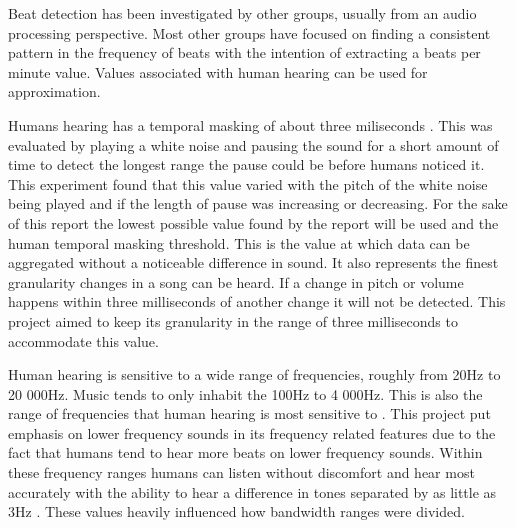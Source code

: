 Beat detection has been investigated by other groups, usually from an audio processing perspective. Most other groups have focused on finding a consistent pattern in the frequency of beats with the intention of extracting a beats per minute value. Values associated with human hearing can be used for approximation.

Humans hearing has a temporal masking of about three miliseconds \cite{temporalmasking}. This was evaluated by playing a white noise and pausing the sound for a short amount of time to detect the longest range the pause could be before humans noticed it. This experiment found that this value varied with the pitch of the white noise being played and if the length of pause was increasing or decreasing. For the sake of this report the lowest possible value found by the report will be used and the human temporal masking threshold. This is the value at which data can be aggregated without a noticeable difference in sound. It also represents the finest granularity changes in a song can be heard. If a change in pitch or volume happens within three milliseconds of another change it will not be detected. This project aimed to keep its granularity in the range of three milliseconds to accommodate this value.

Human hearing is sensitive to a wide range of frequencies, roughly from 20Hz to 20 000Hz\cite{frequencylimits}. Music tends to only inhabit the 100Hz to 4 000Hz. This is also the range of frequencies that human hearing is most sensitive to \cite{frequencylimits}. This project put emphasis on lower frequency sounds in its frequency related features due to the fact that humans tend to hear more beats on lower frequency sounds. Within these frequency ranges humans can listen without discomfort and hear most accurately with the ability to hear a difference in tones separated by as little as 3Hz \cite{frequencylimits}. These values heavily influenced how bandwidth ranges were divided.

